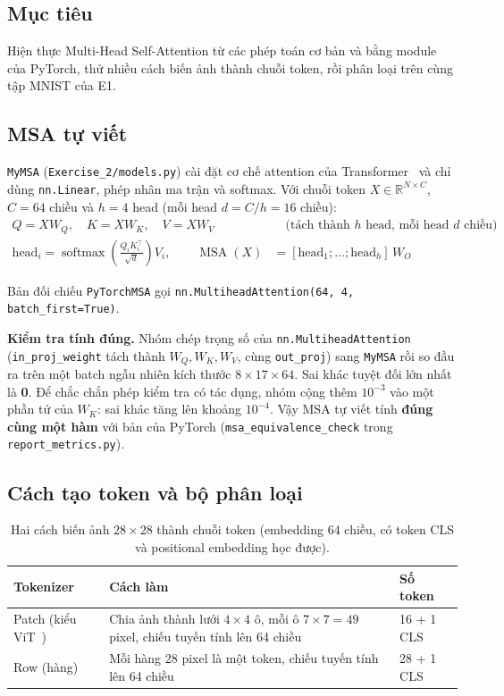 \documentclass[12pt]{article}
\newcommand{\code}[1]{\texttt{#1}}
\newcommand{\st}[1]{\textbf{#1}}
\begin{document}
\subsection{Mục tiêu}
Hiện thực Multi-Head Self-Attention từ các phép toán cơ bản và bằng module của PyTorch, thử nhiều cách biến ảnh thành
chuỗi token, rồi phân loại trên cùng tập MNIST của E1.

\subsection{MSA tự viết}\label{sec:msa}
\code{MyMSA} (\code{Exercise\_2/models.py}) cài đặt cơ chế attention của Transformer~\cite{vaswani2017} và chỉ dùng \code{nn.Linear}, phép nhân ma trận và softmax. Với chuỗi token
$X \in \mathbb{R}^{N \times C}$, $C = 64$ chiều và $h = 4$ head (mỗi head $d = C/h = 16$ chiều):
\begin{align*}
Q = X W_Q,\quad K = X W_K,\quad V = X W_V &\quad\text{(tách thành $h$ head, mỗi head $d$ chiều)}\\
\text{head}_i = \operatorname{softmax}\!\left(\frac{Q_i K_i^\top}{\sqrt{d}}\right) V_i,\qquad
\operatorname{MSA}(X) &= [\text{head}_1; \ldots; \text{head}_h]\, W_O
\end{align*}

Bản đối chiếu \code{PyTorchMSA} gọi \code{nn.MultiheadAttention(64, 4, batch\_first=True)}.

\textbf{Kiểm tra tính đúng.} Nhóm chép trọng số của \code{nn.MultiheadAttention} (\code{in\_proj\_weight} tách thành
$W_Q, W_K, W_V$, cùng \code{out\_proj}) sang \code{MyMSA} rồi so đầu ra trên một batch ngẫu nhiên kích thước
$8 \times 17 \times 64$. Sai khác tuyệt đối lớn nhất là \st{0}. Để chắc chắn phép kiểm tra có tác dụng, nhóm cộng thêm
$10^{-3}$ vào một phần tử của $W_K$: sai khác tăng lên khoảng $10^{-4}$. Vậy MSA tự viết tính \st{đúng cùng một hàm}
với bản của PyTorch (\code{msa\_equivalence\_check} trong \code{report\_metrics.py}).

\subsection{Cách tạo token và bộ phân loại}
\begin{table}[H]
\centering
\caption{Hai cách biến ảnh $28\times28$ thành chuỗi token (embedding 64 chiều, có token CLS và positional embedding học được).}\label{tab:e2-tokens}
\begin{tabularx}{\linewidth}{@{}P{3cm}LR{1.6cm}@{}}
\toprule
Tokenizer & Cách làm & Số token \\\midrule
Patch (kiểu ViT~\cite{dosovitskiy2021}) & Chia ảnh thành lưới $4\times4$ ô, mỗi ô $7\times7 = 49$ pixel, chiếu tuyến tính lên 64 chiều & 16 + 1 CLS \\
Row (hàng) & Mỗi hàng 28 pixel là một token, chiếu tuyến tính lên 64 chiều & 28 + 1 CLS \\
\bottomrule
\end{tabularx}
\end{table}
\end{document}
